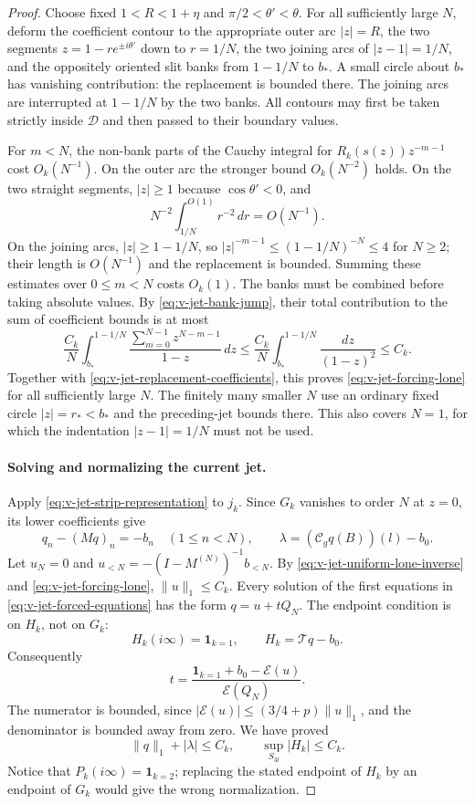 \begin{proof}
Choose fixed $1<R<1+\eta$ and $\pi/2<\theta'<\theta$.
For all sufficiently large $N$, deform the coefficient contour to the
appropriate outer arc $|z|=R$, the two segments
$z=1-r e^{\pm i\theta'}$ down to $r=1/N$, the two joining arcs of
$|z-1|=1/N$, and the oppositely oriented slit banks from $1-1/N$ to
$b_*$.  A small circle about $b_*$ has vanishing contribution: the
replacement is bounded there.  The joining arcs are interrupted at
$1-1/N$ by the two banks.  All contours may first be taken strictly
inside $\mathcal D$ and then passed to their boundary values.

For $m<N$, the non-bank parts of the Cauchy integral for
$R_k(s(z))z^{-m-1}$ cost $O_k(N^{-1})$.  On the outer arc the stronger
bound $O_k(N^{-2})$ holds.  On the two straight segments, $|z|\ge1$
because $\cos\theta'<0$, and
\[
 N^{-2}\int_{1/N}^{O(1)}r^{-2}\,dr=O(N^{-1}).
\]
On the joining arcs, $|z|\ge1-1/N$, so
$|z|^{-m-1}\le(1-1/N)^{-N}\le4$ for $N\ge2$; their length is
$O(N^{-1})$ and the replacement is bounded.  Summing these estimates
over $0\le m<N$ costs $O_k(1)$.
The banks must be combined before taking absolute values.  By
\eqref{eq:v-jet-bank-jump}, their total contribution to the sum of
coefficient bounds is at most
\[
 \frac{C_k}{N}\int_{b_*}^{1-1/N}
       \frac{\sum_{m=0}^{N-1}z^{N-m-1}}{1-z}\,dz
 \le\frac{C_k}{N}\int_{b_*}^{1-1/N}\frac{dz}{(1-z)^2}
 \le C_k.
\]
Together with \eqref{eq:v-jet-replacement-coefficients}, this proves
\eqref{eq:v-jet-forcing-lone} for all sufficiently large $N$.
The finitely many smaller $N$ use an ordinary fixed circle
$|z|=r_*<b_*$ and the preceding-jet bounds there.  This also covers
$N=1$, for which the indentation $|z-1|=1/N$ must not be used.

\paragraph{Solving and normalizing the current jet.}
Apply \eqref{eq:v-jet-strip-representation} to $j_k$.  Since $G_k$
vanishes to order $N$ at $z=0$, its lower coefficients give
\begin{equation}\label{eq:v-jet-forced-equations}
 q_n-(Mq)_n=-b_n\quad(1\le n<N),\qquad
 \lambda=(\mathcal C_g  q(B))( l)-b_0.
\end{equation}
Let $u_N=0$ and
$u_{<N}=-(I-M^{(N)})^{-1}b_{<N}$.  By
\eqref{eq:v-jet-uniform-lone-inverse} and
\eqref{eq:v-jet-forcing-lone}, $\|u\|_1\le C_k$.
Every solution of the first equations in
\eqref{eq:v-jet-forced-equations} has the form $q=u+tQ_N$.
The endpoint condition is on $H_k$, not on $G_k$:
\[
 H_k(i\infty)=\mathbf1_{k=1},\qquad
 H_k=\mathcal Tq-b_0.
\]
Consequently
\[
 t=\frac{\mathbf1_{k=1}+b_0-\mathcal E(u)}{\mathcal E(Q_N)}.
\]
The numerator is bounded, since
$|\mathcal E(u)|\le(3/4+p)\|u\|_1$, and the denominator is bounded
away from zero.  We have proved
\begin{equation}\label{eq:v-jet-q-bound}
 \|q\|_1+|\lambda|\le C_k,
 \qquad \sup_{S_{3 l}}|H_k|\le C_k.
\end{equation}
Notice that $P_k(i\infty)=\mathbf1_{k=2}$; replacing the stated
endpoint of $H_k$ by an endpoint of $G_k$ would give the wrong
normalization.


\end{proof}
